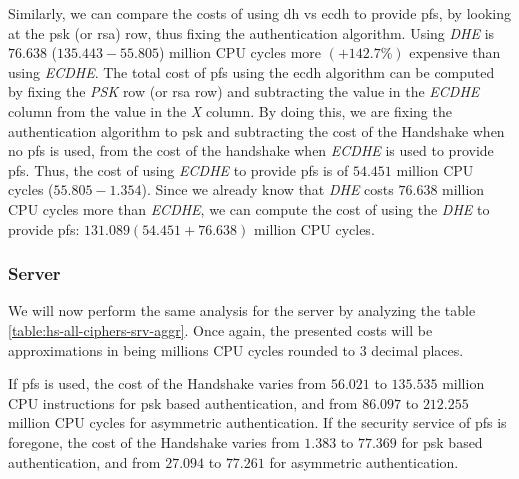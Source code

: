 Similarly, we can compare the costs of using \gls{dh} vs \gls{ecdh} to provide \gls{pfs}, by
looking at the \gls{psk} (or \gls{rsa}) row, thus fixing the authentication algorithm. Using \textit{DHE} is
$76.638$ ($135.443 - 55.805$) million CPU cycles more $(+142.7\%)$ expensive than using \textit{ECDHE}.
The total cost of \gls{pfs}
using the \gls{ecdh} algorithm can be computed by fixing the \textit{PSK} row (or \gls{rsa} row)
and subtracting the value in the \textit{ECDHE} column from the value in the \textit{X} column. By doing this, we are
fixing the authentication algorithm to \gls{psk} and subtracting the cost of the Handshake when no \gls{pfs} is used,
from the cost of the handshake when \textit{ECDHE} is used to provide \gls{pfs}. Thus, the cost of using \textit{ECDHE}
to provide \gls{pfs} is of $54.451$ million CPU cycles ($55.805-1.354$). Since we already know that \textit{DHE} costs
$76.638$ million CPU cycles more than \textit{ECDHE}, we can compute the cost of using the \textit{DHE} to
provide \gls{pfs}: $131.089 (54.451+76.638)$ million CPU cycles.

\subsubsection{Server}

We will now perform the same analysis for the server by analyzing the table \ref{table:hs-all-ciphers-srv-aggr}. 
Once again, the presented costs will be approximations in
being millions CPU cycles rounded to $3$ decimal places.

If \gls{pfs} is used, the cost of the Handshake varies from $56.021$ to $135.535$
million CPU instructions for \gls{psk} based authentication, and from $86.097$ to $212.255$ million CPU cycles for
asymmetric authentication. If the security service of \gls{pfs} is foregone, the cost
of the Handshake varies from $1.383$  to $77.369$ for \gls{psk} based authentication,
and from $27.094$ to $77.261$ for asymmetric authentication.

